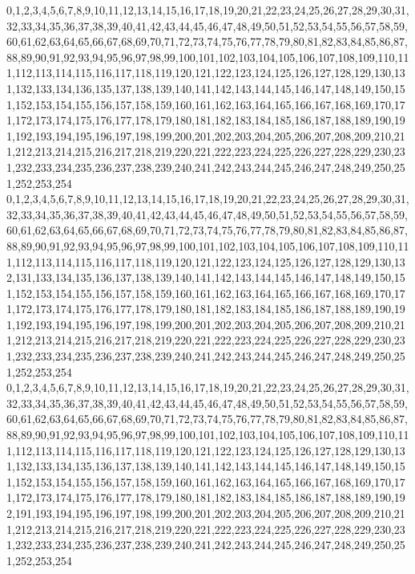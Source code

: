 \documentclass[12pt]{article}
\begin{document}
{0,1,2,3,4,5,6,7,8,9,10,11,12,13,14,15,16,17,18,19,20,21,22,23,24,25,26,27,28,29,30,31,32,33,34,35,36,37,38,39,40,41,42,43,44,45,46,47,48,49,50,51,52,53,54,55,56,57,58,59,60,61,62,63,64,65,66,67,68,69,70,71,72,73,74,75,76,77,78,79,80,81,82,83,84,85,86,87,88,89,90,91,92,93,94,95,96,97,98,99,100,101,102,103,104,105,106,107,108,109,110,111,112,113,114,115,116,117,118,119,120,121,122,123,124,125,126,127,128,129,130,131,132,133,134,136,135,137,138,139,140,141,142,143,144,145,146,147,148,149,150,151,152,153,154,155,156,157,158,159,160,161,162,163,164,165,166,167,168,169,170,171,172,173,174,175,176,177,178,179,180,181,182,183,184,185,186,187,188,189,190,191,192,193,194,195,196,197,198,199,200,201,202,203,204,205,206,207,208,209,210,211,212,213,214,215,216,217,218,219,220,221,222,223,224,225,226,227,228,229,230,231,232,233,234,235,236,237,238,239,240,241,242,243,244,245,246,247,248,249,250,251,252,253,254\\
0,1,2,3,4,5,6,7,8,9,10,11,12,13,14,15,16,17,18,19,20,21,22,23,24,25,26,27,28,29,30,31,32,33,34,35,36,37,38,39,40,41,42,43,44,45,46,47,48,49,50,51,52,53,54,55,56,57,58,59,60,61,62,63,64,65,66,67,68,69,70,71,72,73,74,75,76,77,78,79,80,81,82,83,84,85,86,87,88,89,90,91,92,93,94,95,96,97,98,99,100,101,102,103,104,105,106,107,108,109,110,111,112,113,114,115,116,117,118,119,120,121,122,123,124,125,126,127,128,129,130,132,131,133,134,135,136,137,138,139,140,141,142,143,144,145,146,147,148,149,150,151,152,153,154,155,156,157,158,159,160,161,162,163,164,165,166,167,168,169,170,171,172,173,174,175,176,177,178,179,180,181,182,183,184,185,186,187,188,189,190,191,192,193,194,195,196,197,198,199,200,201,202,203,204,205,206,207,208,209,210,211,212,213,214,215,216,217,218,219,220,221,222,223,224,225,226,227,228,229,230,231,232,233,234,235,236,237,238,239,240,241,242,243,244,245,246,247,248,249,250,251,252,253,254\\
0,1,2,3,4,5,6,7,8,9,10,11,12,13,14,15,16,17,18,19,20,21,22,23,24,25,26,27,28,29,30,31,32,33,34,35,36,37,38,39,40,41,42,43,44,45,46,47,48,49,50,51,52,53,54,55,56,57,58,59,60,61,62,63,64,65,66,67,68,69,70,71,72,73,74,75,76,77,78,79,80,81,82,83,84,85,86,87,88,89,90,91,92,93,94,95,96,97,98,99,100,101,102,103,104,105,106,107,108,109,110,111,112,113,114,115,116,117,118,119,120,121,122,123,124,125,126,127,128,129,130,131,132,133,134,135,136,137,138,139,140,141,142,143,144,145,146,147,148,149,150,151,152,153,154,155,156,157,158,159,160,161,162,163,164,165,166,167,168,169,170,171,172,173,174,175,176,177,178,179,180,181,182,183,184,185,186,187,188,189,190,192,191,193,194,195,196,197,198,199,200,201,202,203,204,205,206,207,208,209,210,211,212,213,214,215,216,217,218,219,220,221,222,223,224,225,226,227,228,229,230,231,232,233,234,235,236,237,238,239,240,241,242,243,244,245,246,247,248,249,250,251,252,253,254\\
}
\end{document}
